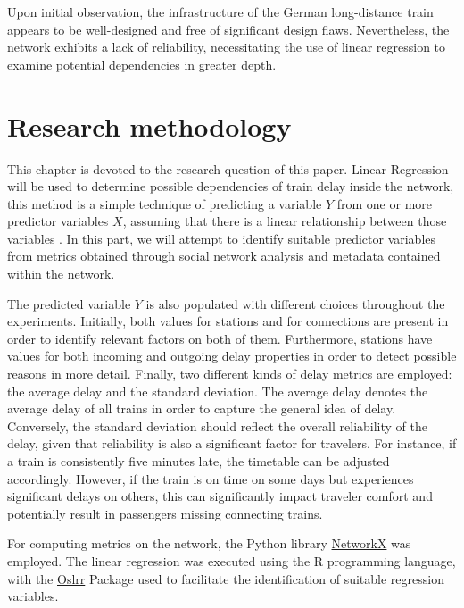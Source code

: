 \documentclass[12pt,a4paper]{article}
\begin{document}
Upon initial observation, the infrastructure of the German long-distance train appears to be well-designed and free of significant design flaws. Nevertheless, the network exhibits a lack of reliability, necessitating the use of linear regression to examine potential dependencies in greater depth.
\maketitle
\section{\label{sec:Research methodology}Research methodology}

This chapter is devoted to the research question of this paper. Linear Regression will be used to determine possible dependencies of train delay inside the network, this method is a simple technique of predicting a variable $Y$ from one or more predictor variables $X$, assuming that there is a linear relationship between those variables \citep[p.~70]{James2023}. 
In this part, we will attempt to identify suitable predictor variables from metrics obtained through social network analysis and metadata contained within the network.

The predicted variable $Y$ is also populated with different choices throughout the experiments. Initially, both values for stations and for connections are present in order to identify relevant factors on both of them. 
Furthermore, stations have values for both incoming and outgoing delay properties in order to detect possible reasons in more detail. Finally, two different kinds of delay metrics are employed: the average delay and the standard deviation. 
The average delay denotes the average delay of all trains in order to capture the general idea of delay. Conversely, the standard deviation should reflect the overall reliability of the delay, given that reliability is also a significant factor for travelers. 
For instance, if a train is consistently five minutes late, the timetable can be adjusted accordingly. However, if the train is on time on some days but experiences significant delays on others, this can significantly impact traveler comfort and potentially result in passengers missing connecting trains.

For computing metrics on the network, the Python library \href{https://networkx.org/}{NetworkX} was employed. The linear regression was executed using the R programming language, with the \href{https://cran.r-project.org/web/packages/olsrr/index.html}{Oslrr} Package used to facilitate the identification of suitable regression variables.
\end{document}
